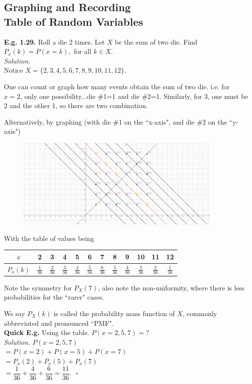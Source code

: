 \documentclass[12pt]{book}
\begin{document}
\subsection{Graphing and Recording \\Table of Random Variables}
\noindent \textbf{E.g. 1.29. } Roll a die 2 times. Let $X$ be the sum of two die. Find $P_x(k)=P(x=k),$ for all $k\in X$.\\
\textit{Solution.}\\
Notice $X=\{2,3,4,5,6,7,8,9,10,11,12\}$.

One can count or graph how many events obtain the sum of two die.
i.e. for $x=2$, only one possibility...die \#1=1 and die \#2=1.
Similarly, for 3, one must be 2 and the other 1, so there are two combination.

Alternatively, by graphing (with die \#1 on the ``x-axis", and die \#2 on the ``y-axis")

\begin{figure}[h]
  \includegraphics[width=4in]{PMF of 2 dice.png}
\end{figure}
\noindent With the table of values being
\begin{center}
\begin{tabular}{ |c|c|c|c|c|c|c|c|c|c|c|c| }
\hline
	$x$ & 2 & 3 & 4 & 5 & 6 & 7 & 8 & 9 & 10 & 11 & 12 \\
\hline 
	$P_{x}(k)$ & $\frac{1}{36}$ & $\frac{2}{36}$ & $\frac{3}{36}$ & $\frac{4}{36}$ & $\frac{5}{36}$ & $\frac{6}{36}$ & $\frac{5}{36}$ & $\frac{4}{36}$ & $\frac{3}{36}$ & $\frac{2}{36}$ & $\frac{1}{36}$  \\
\hline
\end{tabular}
\end{center}
Note the symmetry for $P_{X}(7)$, also note the non-uniformity, where there is less probabilities for the ``rarer" cases.

We say $P_{X}(k)$ is called the probability mass function of $X$, commonly abbreviated and pronounced ``PMF".\\

\noindent \textbf{Quick E.g. } Using the table. $P(x=2,5,7)=?$\\
\noindent \textit{Solution. }
$P(x=2,5,7)$\\
$= P(x=2)+P(x=5) +P(x=7)$\\
$=P_{x}(2)+P_{x}(5)+P_{x}(7)$\\
$=\dfrac{1}{36} + \dfrac{4}{36} + \dfrac{6}{36}= \dfrac{11}{36}.~~~\square$\\
\end{document}
